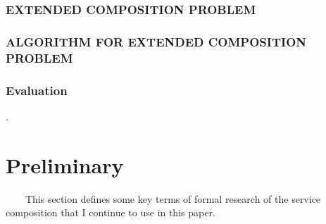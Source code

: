 \documentclass[senior,final,11pt]{iscs-thesis}
\begin{document}
\subsection{EXTENDED COMPOSITION PROBLEM}

\subsection{ALGORITHM FOR EXTENDED COMPOSITION PROBLEM}
\subsection{Evaluation}


\cite{4065825}. 
\chapter{Preliminary}%
~~~~This section defines some key terms of formal research of the service composition that I continue to use in this paper.
\end{document}
